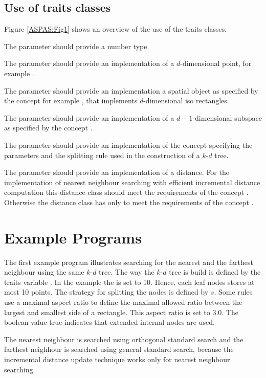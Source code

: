 \subsection{Use of traits classes}

Figure \ref{ASPAS:Fig1} shows an overview of the use of the traits classes.

The parameter  should provide a number type.

The parameter  should provide an implementation of a $d$-dimensional point, 
for example .

The parameter  should provide an implementation a spatial object
as specified by the concept 
for example , that implements $d$-dimensional iso rectangles.

The parameter  should provide an implementation of a $d-1$-dimensional
subspace as specified by the concept .

The parameter  should provide an implementation of the concept 
specifying the parameters and the splitting rule used in the construction of a $k$-$d$ tree.

The parameter  should provide an implementation of a distance.
For the implementation of nearest neighbour searching with efficient incremental
distance computation this distance class should meet the requirements of the concept
. Otherwise the distance class has only to meet the
requirements of the concept .

\section{Example Programs}

The first example program illustrates searching for the nearest and the farthest neighbour using the
same $k$-$d$ tree.
The way the $k$-$d$ tree is build is defined by the traits variable .
In the example the  is set to 10.
Hence, each leaf nodes stores at most 10 points.
The strategy for splitting the nodes is defined by $s$.
Some rules use a maximal aspect ratio to define
the maximal allowed ratio between the largest and smallest side of a rectangle.
This aspect ratio is set to 3.0. The boolean value true indicates that
extended internal nodes are used.

The nearest neighbour is searched using orthogonal standard search and
the farthest neighhour is searched using general standard search, because the
incremental distance update technique works only for nearest neighbour searching.

